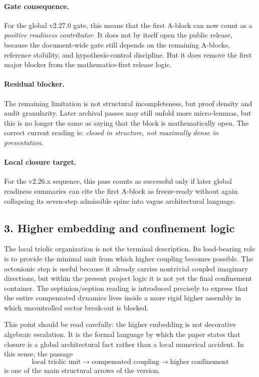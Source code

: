 \paragraph{Gate consequence.}
For the global v2.27.0 gate, this means that the first A-block can now count as
a \emph{positive readiness contributor}. It does not by itself open the public
release, because the document-wide gate still depends on the remaining A-blocks,
reference stability, and hypothesis-control discipline. But it does remove the
first major blocker from the mathematics-first release logic.

\paragraph{Residual blocker.}
The remaining limitation is not structural incompleteness, but proof density and
audit granularity. Later archival passes may still unfold more micro-lemmas,
but this is no longer the same as saying that the block is mathematically open.
The correct current reading is: \emph{closed in structure, not maximally dense in
presentation}.

\paragraph{Local closure target.}
For the v2.26.x sequence, this pass counts as successful only if later global
readiness summaries can cite the first A-block as freeze-ready without again
collapsing its seven-step admissible spine into vague architectural language.

\subsection*{3. Higher embedding and confinement logic}
The local triolic organization is not the terminal description. Its load-bearing
role is to provide the minimal unit from which higher coupling becomes possible.
The octonionic step is useful because it already carries nontrivial coupled
imaginary directions, but within the present project logic it is not yet the
final confinement container. The septinion/seption reading is introduced
precisely to express that the entire compensated dynamics lives inside a more
rigid higher assembly in which uncontrolled sector break-out is blocked.

This point should be read carefully: the higher embedding is not decorative
algebraic escalation. It is the formal language by which the paper states that
closure is a global architectural fact rather than a local numerical accident.
In this sense, the passage
\[
\text{local triolic unit} \to \text{compensated coupling} \to \text{higher confinement}
\]
is one of the main structural arrows of the version.

